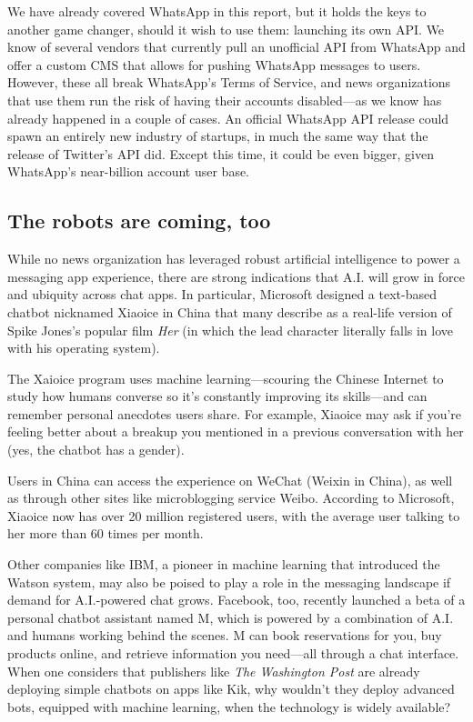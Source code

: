 \documentclass[notoc, symmetric, nobib, nols]{towcenter-guideto-book}
\begin{document}
We have already covered WhatsApp in this report, but it holds the keys to another game changer, should it wish to use them: launching its own API. We know of several vendors that currently pull an unofficial API from WhatsApp and offer a custom CMS that allows for pushing WhatsApp messages to users. However, these all break WhatsApp's Terms of Service, and news organizations that use them run the risk of having their accounts disabled---as we know has already happened in a couple of cases. An official WhatsApp API release could spawn an entirely new industry of startups, in much the same way that the release of Twitter's API did. Except this time, it could be even bigger, given WhatsApp's near-billion account user base.

\subsection{The robots are coming, too}

While no news organization has leveraged robust artificial intelligence to power a messaging app experience, there are strong indications that A.I. will grow in force and ubiquity across chat apps. In particular, Microsoft designed a text-based chatbot nicknamed Xiaoice in China that many describe as a real-life version of Spike Jones's popular film \textit{Her} (in which the lead character literally falls in love with his operating system).  

The Xaioice program uses machine learning---scouring the Chinese Internet to study how humans converse so it's constantly improving its skills---and can remember personal anecdotes users share. For example, Xiaoice may ask if you're feeling better about a breakup you mentioned in a previous conversation with her (yes, the chatbot has a gender).

Users in China can access the experience on WeChat (Weixin in China), as well as through other sites like microblogging service Weibo. According to Microsoft, Xiaoice now has over 20 million registered users, with the average user talking to her more than 60 times per month.\autocite{BingXiaoIce} 

Other companies like IBM, a pioneer in machine learning that introduced the Watson system, may also be poised to play a role in the messaging landscape if demand for A.I.-powered chat grows. Facebook, too, recently launched a beta of a personal chatbot assistant named M, which is powered by a combination of A.I. and humans working behind the scenes. M can book reservations for you, buy products online, and retrieve information you need---all through a chat interface. When one considers that publishers like \textit{The Washington Post} are already deploying simple chatbots on apps like Kik, why wouldn't they deploy advanced bots, equipped with machine learning, when the technology is widely available?
\end{document}

